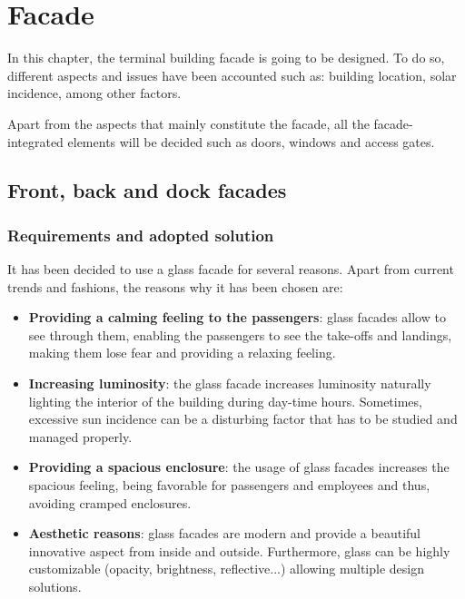 \chapter{Facade}

In this chapter, the terminal building facade is going to be designed. To do so, different aspects and issues have been accounted such as: building location, solar incidence, among other factors.

Apart from the aspects that mainly constitute the facade, all the facade-integrated elements will be decided such as doors, windows and access gates. 

	\section{Front, back and dock facades}
		\subsection{Requirements and adopted solution}
		
It has been decided to use a glass facade for several reasons. Apart from current trends and fashions, the reasons why it has been chosen are:
\begin{itemize}
\item \textbf{Providing a calming feeling to the passengers}: glass facades allow to see through them, enabling the passengers to see the take-offs and landings, making them lose fear and providing a relaxing feeling.
\item \textbf{Increasing luminosity}: the glass facade increases luminosity naturally lighting the interior of the building during day-time hours. Sometimes, excessive sun incidence can be a disturbing factor that has to be studied and managed properly.
\item \textbf{Providing a spacious enclosure}: the usage of glass facades increases the spacious feeling, being favorable for passengers and employees and thus, avoiding cramped enclosures.
\item \textbf{Aesthetic reasons}: glass facades are modern and provide a beautiful innovative aspect from inside and outside. Furthermore, glass can be highly customizable (opacity, brightness, reflective...) allowing multiple design solutions.
\end{itemize}

